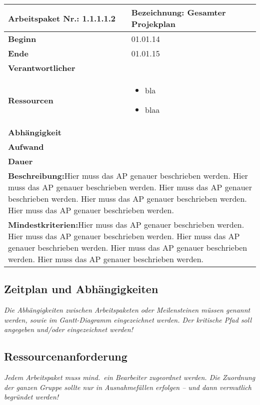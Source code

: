 \documentclass[fontsize=12pt,paper=a4,twoside]{scrartcl}
\begin{document}
 \begin{tabular}{|p{5.3cm}|p{9.7cm}|}\hline
   \textbf{Arbeitspaket Nr.:} 1.1.1.1.2 & \textbf{Bezeichnung:} Gesamter Projekplan\\ \hline \hline
   \textbf{Beginn} & 01.01.14\\ \hline
   \textbf{Ende} & 01.01.15\\ \hline
   \textbf{Verantwortlicher} & \\ \hline
   \textbf{Ressourcen} & \begin{itemize}
   \item bla
   \item blaa
\end{itemize}    \\ \hline
\textbf{Abhängigkeit} &\\ \hline
 \textbf{Aufwand} & \\ \hline
 \textbf{Dauer} & \\ \hline
   \multicolumn{2}{|p{15cm}|}{\textbf{Beschreibung:}\newline  Hier muss das AP genauer beschrieben werden. Hier muss das AP genauer beschrieben werden. Hier muss das AP genauer beschrieben werden. Hier muss das AP genauer beschrieben werden. Hier muss das AP genauer beschrieben werden. }\\ \hline
    \multicolumn{2}{|p{15cm}|}{\textbf{Mindestkriterien:}\newline  Hier muss das AP genauer beschrieben werden. Hier muss das AP genauer beschrieben werden. Hier muss das AP genauer beschrieben werden. Hier muss das AP genauer beschrieben werden. Hier muss das AP genauer beschrieben werden. }\\ \hline
 \end{tabular}



\subsection{Zeitplan und Abhängigkeiten}

{\em Die Abhängigkeiten zwischen Arbeitspaketen oder Meilensteinen müssen genannt werden, sowie im
  Gantt-Diagramm eingezeichnet werden. Der kritische Pfad soll
  angegeben und/oder eingezeichnet werden!}

\subsection{Ressourcenanforderung}

{\em Jedem Arbeitspaket muss mind.\ ein Bearbeiter zugeordnet
  werden. Die Zuordnung der ganzen Gruppe sollte nur in Ausnahmefällen
  erfolgen -- und dann vermutlich begründet werden!}
\end{document}

